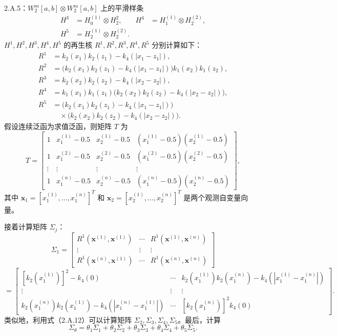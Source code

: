 \begin{bookexample}{2.A.5：$W_2^m[a,b]\otimes W_2^m[a,b]$ 上的平滑样条}
\[\begin{aligned}
H^3&=H_0^{(1)}\otimes H_2^2,&
H^4&=H_1^{(1)}\otimes H_2^{(2)},\\
H^5&=H_2^{(1)}\otimes H_2^{(2)}.
\end{aligned}
\]
$H^1,H^2,H^3,H^4,H^5$ 的再生核 $R^1,R^2,R^3,R^4,R^5$ 分别计算如下：
\begin{equation}
\begin{aligned}
R^1&=k_2(x_1)k_2(z_1)-k_4(|x_1-z_1|),\\
R^2&=\bigl(k_2(x_1)k_2(z_1)-k_4(|x_1-z_1|)\bigr)k_1(x_2)k_1(z_2),\\
R^3&=k_2(x_2)k_2(z_2)-k_4(|x_2-z_2|),\\
R^4&=k_1(x_1)k_1(z_1)\bigl(k_2(x_2)k_2(z_2)-k_4(|x_2-z_2|)\bigr),\\
R^5&=\bigl(k_2(x_1)k_2(z_1)-k_4(|x_1-z_1|)\bigr)\\
 &\quad{}\times\bigl(k_2(x_2)k_2(z_2)-k_4(|x_2-z_2|)\bigr).
\end{aligned}\tag{2.A.110}
\end{equation}
假设连续泛函为求值泛函，则矩阵 $T$ 为
\begin{equation}
T=\begin{bmatrix}
1&x_1^{(1)}-0.5&x_2^{(1)}-0.5&(x_1^{(1)}-0.5)(x_2^{(1)}-0.5)\\
1&x_1^{(2)}-0.5&x_2^{(2)}-0.5&(x_1^{(2)}-0.5)(x_2^{(2)}-0.5)\\
\vdots&\vdots&\vdots&\vdots\\
1&x_1^{(n)}-0.5&x_2^{(n)}-0.5&(x_1^{(n)}-0.5)(x_2^{(n)}-0.5)
\end{bmatrix},\tag{2.A.111}
\end{equation}
其中 $\boldsymbol x_1=[x_1^{(1)},\ldots,x_1^{(n)}]^T$ 和 $\boldsymbol x_2=[x_2^{(1)},\ldots,x_2^{(n)}]^T$ 是两个观测自变量向量。

接着计算矩阵 $\Sigma_j$：
\[
\Sigma_1=\begin{bmatrix}
R^1(\boldsymbol x^{(1)},\boldsymbol x^{(1)})&\cdots&
 R^1(\boldsymbol x^{(1)},\boldsymbol x^{(n)})\\
\vdots&\vdots&\vdots\\
R^1(\boldsymbol x^{(n)},\boldsymbol x^{(1)})&\cdots&
 R^1(\boldsymbol x^{(n)},\boldsymbol x^{(n)})
\end{bmatrix}
\]
\[
=\begin{bmatrix}
[k_2(x_1^{(1)})]^2-k_4(0)&\cdots&
 k_2(x_1^{(1)})k_2(x_1^{(n)})-k_4(|x_1^{(1)}-x_1^{(n)}|)\\
\vdots&\vdots&\vdots\\
k_2(x_1^{(n)})k_2(x_1^{(1)})-k_4(|x_1^{(n)}-x_1^{(1)}|)&\cdots&
 [k_2(x_1^{(n)})]^2k_4(0)
\end{bmatrix}.
\]
类似地，利用式（2.A.12）可以计算矩阵 $\Sigma_2,\Sigma_3,\Sigma_4,\Sigma_5$。最后，计算
\[
\Sigma_\theta=\theta_1\Sigma_1+\theta_2\Sigma_2+\theta_3\Sigma_3
 +\theta_4\Sigma_4+\theta_5\Sigma_5.
\]
\end{bookexample}
